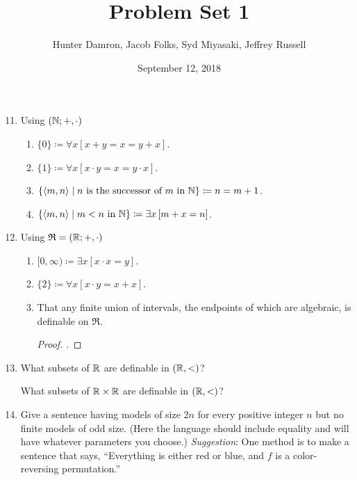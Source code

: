 \documentclass{homework}
\title{Problem Set 1}
\author{Hunter Damron, Jacob Folks, Syd Miyasaki, Jeffrey Russell}
\date{September 12, 2018}
\begin{document}
	\maketitle
	\begin{enumerate}
		\setcounter{enumi}{10}
		\item Using $(\mathbb{N}; +, \cdot)$
		\begin{enumerate}
			\item $\{0\} \coloneqq \forall x \left[x + y = x = y + x\right]$.
			\item $\{1\} \coloneqq \forall x \left[x \cdot y = x = y \cdot x \right]$.
			\item $\{\langle m,n \rangle \mid n \text{ is the successor of } m \text{ in } \mathbb{N}\} \coloneqq n = m + 1$.
			\item $\{\langle m,n \rangle \mid m < n \text{ in } \mathbb{N}\} \coloneqq \exists x \left[m + x = n\right]$.
		\end{enumerate}
		\item Using $\mathfrak{R} = (\mathbb{R}; +, \cdot)$
		\begin{enumerate}
			\item $[0, \infty) \coloneqq \exists x \left[x \cdot x = y\right]$.
			\item $\{2\} \coloneqq \forall x [x \cdot y = x + x]$.
			\item That any finite union of intervals, the endpoints of which are algebraic, is definable on $\mathfrak{R}$.
			\begin{proof}
				\TODO.
			\end{proof}
		\end{enumerate}
		
		\setcounter{enumi}{13}
		\item What subsets of $\mathbb{R}$ are definable in $(\mathbb{R}, <)$? \TODO
		
		What subsets of $\mathbb{R}\times\mathbb{R}$ are definable in $(\mathbb{R}, <)$? \TODO
		
		\setcounter{enumi}{15}
		\item Give a sentence having models of size $2n$ for every positive integer $n$ but no finite models of odd size. (Here the language should include equality and will have whatever parameters you choose.) \emph{Suggestion}: One method is to make a sentence that says, ``Everything is either red or blue, and $f$ is a color-reversing permutation.''
		
		\TODO
	\end{enumerate}
\end{document}

